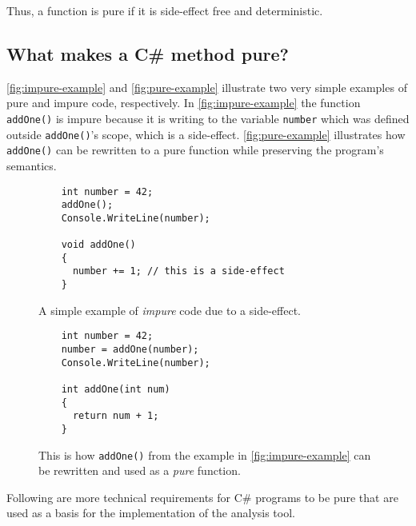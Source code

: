 \documentclass[a4paper,12pt]{article}
\begin{document}

Thus, a function is pure if it is side-effect free and deterministic.

\subsection{What makes a C\# method pure?} \label{sub:What makes a Cs program functional?}
\autoref{fig:impure-example} and \autoref{fig:pure-example} illustrate two very simple examples of pure and impure code, respectively. In \autoref{fig:impure-example} the function \texttt{addOne()} is impure because it is writing to the variable \texttt{number} which was defined outside \texttt{addOne()}'s scope, which is a side-effect. \autoref{fig:pure-example} illustrates how \texttt{addOne()} can be rewritten to a pure function while preserving the program's semantics.

\begin{figure}[H]
  \centering
  \begin{lstlisting}
    int number = 42;
    addOne();
    Console.WriteLine(number);

    void addOne()
    {
      number += 1; // this is a side-effect
    }
  \end{lstlisting}
  \caption{A simple example of \textit{impure} code due to a side-effect.}
  \label{fig:impure-example}
\end{figure}

\begin{figure}[H]
  \centering
  \begin{lstlisting}
    int number = 42;
    number = addOne(number);
    Console.WriteLine(number);

    int addOne(int num)
    {
      return num + 1;
    }
  \end{lstlisting}
  \caption{This is how \texttt{addOne()} from the example in \autoref{fig:impure-example} can be rewritten and used as a \textit{pure} function.}
  \label{fig:pure-example}
\end{figure}

Following are more technical requirements for C\# programs to be pure that are used as a basis for the implementation of the analysis tool. %

\end{document}
